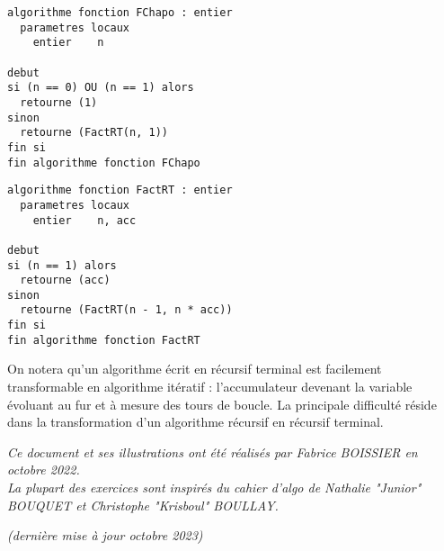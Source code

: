 \documentclass[11pt,a4paper]{article}
\begin{document}
\begin{table}[!ht]
  \centering
  \begin{minipage}{0.478\textwidth}
    \centering
\begin{lstlisting}[style=algorithmique]
algorithme fonction FChapo : entier
  parametres locaux
    entier    n

debut
si (n == 0) OU (n == 1) alors
  retourne (1)
sinon
  retourne (FactRT(n, 1))
fin si
fin algorithme fonction FChapo \end{lstlisting}
  \end{minipage}
  \hfillx
  \begin{minipage}{0.48\textwidth}
    \centering
\begin{lstlisting}[style=algorithmique]
algorithme fonction FactRT : entier
  parametres locaux
    entier    n, acc

debut
si (n == 1) alors
  retourne (acc)
sinon
  retourne (FactRT(n - 1, n * acc))
fin si
fin algorithme fonction FactRT \end{lstlisting}
  \end{minipage}
\end{table}

On notera qu'un algorithme écrit en récursif terminal est facilement transformable en algorithme itératif : l'accumulateur devenant la variable évoluant au fur et à mesure des tours de boucle.
La principale difficulté réside dans la transformation d'un algorithme récursif en récursif terminal.

\bigskip



\vfillFirst

\vfillLast


\begin{center}
\textit{Ce document et ses illustrations ont été réalisés par Fabrice BOISSIER en octobre 2022.\\
La plupart des exercices sont inspirés du cahier d'algo de Nathalie "Junior" BOUQUET et Christophe "Krisboul" BOULLAY.}

\textit{(dernière mise à jour octobre 2023)}
\end{center}
\end{document}
